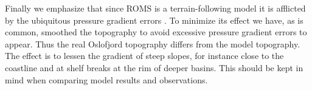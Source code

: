 Finally we emphasize that since ROMS is a terrain-following model it is afflicted by the ubiquitous pressure gradient errors \citep[][and references therein]{bernt:thiem:2007}. To minimize its effect we have, as is common, smoothed the topography to avoid excessive pressure gradient errors to appear. Thus the real Oslofjord topography differs from the model topography. The effect is to lessen the gradient of steep slopes, for instance close to the coastline and at shelf breaks at the rim of deeper basins. This should be kept in mind when comparing model results and observations.   


